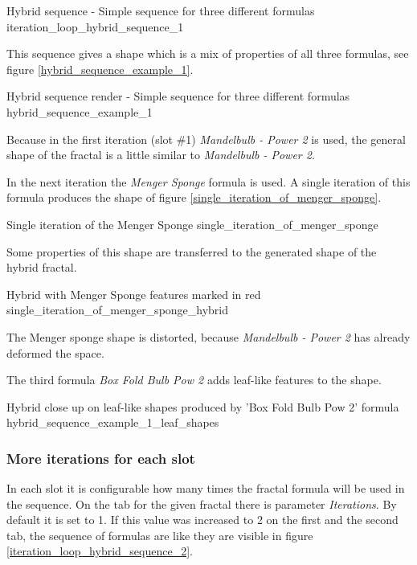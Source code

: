 {Hybrid sequence - Simple sequence for three different formulas}
{iteration_loop_hybrid_sequence_1}

This sequence gives a shape which is a mix of properties of all three
formulas, see figure \ref{hybrid_sequence_example_1}.

{Hybrid sequence render - Simple sequence for three different formulas}
{hybrid_sequence_example_1}

Because in the first iteration (slot \#1) \emph{Mandelbulb - Power 2} is used, the general shape
of the fractal is a little similar to \emph{Mandelbulb - Power 2}.

In the next iteration the \emph{Menger Sponge} formula is used. A single iteration
of this formula produces the shape of figure \ref{single_iteration_of_menger_sponge}.

{Single iteration of the Menger Sponge}
{single_iteration_of_menger_sponge}

Some properties of this shape are transferred to the generated shape of the hybrid fractal.

{Hybrid with Menger Sponge features marked in red}
{single_iteration_of_menger_sponge_hybrid}

The Menger sponge shape is distorted, because \emph{Mandelbulb - Power 2} has
already deformed the space.

The third formula \emph{Box Fold Bulb Pow 2} adds leaf-like features to the shape.

{Hybrid close up on leaf-like shapes produced by 'Box Fold Bulb Pow 2' formula}
{hybrid_sequence_example_1_leaf_shapes}

\subsubsection{More iterations for each slot}

In each slot it is configurable how many times the fractal formula will be used in the sequence.
On the tab for the given fractal there is parameter \emph{Iterations}.
By default it is set to 1. If this value was increased to 2 on the first and the second tab,
the sequence of formulas are like they are visible in figure \ref{iteration_loop_hybrid_sequence_2}. \label{two-iterations-per-slot}

